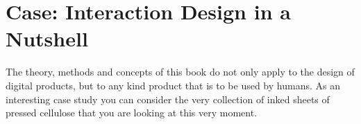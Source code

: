 \chapter{Case: Interaction Design in a Nutshell} \label{chap:case_meta}
The theory, methods and concepts of this book do not only apply to the design of digital products, but to any kind product that is to be used by humans. As an interesting case study you can consider the very collection of inked sheets of pressed cellulose that you are looking at this very moment. 

